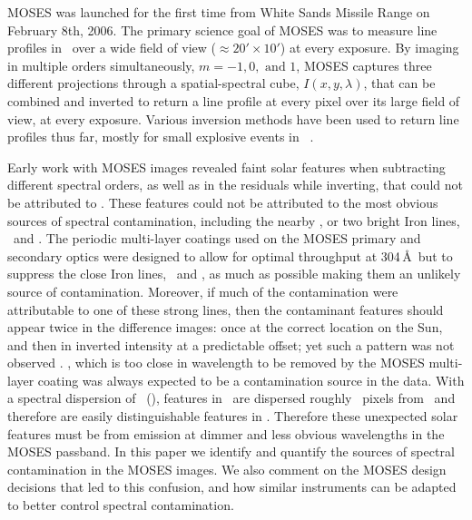	MOSES was launched for the first time from White Sands Missile Range on February 8th, 2006.
	The primary science goal of MOSES was to measure line profiles in \heii \ over a wide field of view ($\approx 20' \times 10'$) at every exposure.
	By imaging in multiple orders simultaneously, $m = -1, 0, \text{\ and\ } 1$, MOSES captures three different projections through a spatial-spectral cube, $I(x,y,\lambda)$, that can be combined and inverted to return a line profile at every pixel over its large field of view, at every exposure.
	Various inversion methods have been used to return line profiles thus far, mostly for small explosive events in \heii\ \citep{Fox2010,Fox2011,Courrier2018,Rust2019}.
	
	Early work with MOSES images revealed faint solar features when subtracting different spectral orders, as well as in the residuals while inverting, that could not be attributed to \heii.
	These features could not be attributed to the most obvious sources of spectral contamination, including the nearby \sixi, or two bright Iron lines, \fexv\ and \fexvi.
	The periodic multi-layer coatings used on the MOSES primary and secondary optics were designed to allow for optimal throughput at 304\,\AA \ but to suppress the close Iron lines, \fexv\ and \fexvi, as much as possible \citep{Owens2005} making them an unlikely source of contamination.
	Moreover, if much of the contamination were attributable to one of these strong lines, then the contaminant features should appear twice in the difference images: once at the correct location on the Sun, and then in inverted intensity at a predictable offset; yet such a pattern was not observed \citep{Fox2011}.
	\sixi, which is too close in wavelength to be removed by the MOSES multi-layer coating was always expected to be a contamination source in the data.
	With a spectral dispersion of \spectdisperspix\ (\spectdispersvel), features in \sixi \ are dispersed roughly \sixipix\ pixels from \heii \ and therefore are easily distinguishable features in \heii.
	Therefore these unexpected solar features must be from emission at dimmer and less obvious wavelengths in the MOSES passband.
	In this paper we identify and quantify the sources of spectral contamination in the MOSES images.
	We also comment on the MOSES design decisions that led to this confusion, and how similar instruments can be adapted to better control spectral contamination.
	
